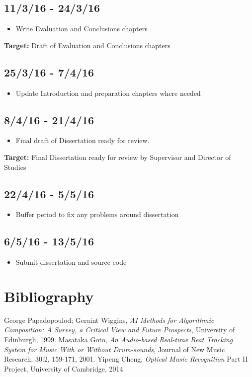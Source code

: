 \documentclass[12pt,a4]{article}
\begin{document}
        \subsection{11/3/16 - 24/3/16}
        \begin{itemize}
            \item Write Evaluation and Conclusions chapters
        \end{itemize}
{\bf Target:} Draft of Evaluation and Conclusions chapters
        \subsection{25/3/16 - 7/4/16}
        \begin{itemize}
            \item Update Introduction and preparation chapters where needed
        \end{itemize}
        \subsection{8/4/16 - 21/4/16}
        \begin{itemize}
            \item Final draft of Dissertation ready for review.
        \end{itemize}
{\bf Target:} Final Dissertation ready for review by Supervisor and Director of Studies
        \subsection{22/4/16 - 5/5/16}
        \begin{itemize}
            \item Buffer period to fix any problems around dissertation
        \end{itemize}
        \subsection{6/5/16 - 13/5/16}
            \begin{itemize}
                \item Submit dissertation and source code
            \end{itemize}
        

    \section{Bibliography}
\begin{thebibliography}{9}
        George Papadopoulod; Geraint Wiggins,
        \emph{AI Methods for Algorithmic Composition: A Survey, a Critical View and Future Prospects},
        University of Edinburgh,
        1999.
        Masataka Goto,
        \emph{An Audio-based Real-time Beat Tracking System for
    Music With or Without Drum-sounds},
        Journal of New Music Research, 30:2, 159-171,
        2001.
	Yipeng Cheng,
	\emph{Optical Music Recognition}
	Part II Project, University of Cambridge,
	2014
    

\end{thebibliography}
\end{document}

